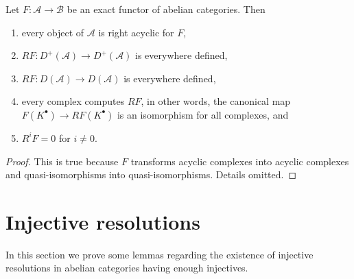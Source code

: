 \begin{lemma}
\label{lemma-right-derived-exact-functor}
Let $F : \mathcal{A} \to \mathcal{B}$ be an exact functor of
abelian categories. Then
\begin{enumerate}
\item every object of $\mathcal{A}$ is right acyclic for $F$,
\item $RF : D^{+}(\mathcal{A}) \to D^{+}(\mathcal{A})$ is everywhere defined,
\item $RF : D(\mathcal{A}) \to D(\mathcal{A})$ is everywhere defined,
\item every complex computes $RF$, in other words, the canonical
map $F(K^\bullet) \to RF(K^\bullet)$ is an isomorphism for all complexes, and
\item $R^iF = 0$ for $i \not = 0$.
\end{enumerate}
\end{lemma}

\begin{proof}
This is true because $F$ transforms acyclic complexes into acyclic complexes
and quasi-isomorphisms into quasi-isomorphisms. Details omitted.
\end{proof}










\section{Injective resolutions}
\label{section-injective-resolutions}

\noindent
In this section we prove some lemmas regarding the existence
of injective resolutions in abelian categories having enough injectives.

